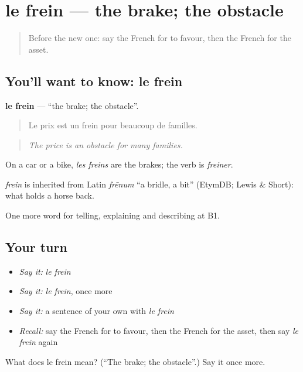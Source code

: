 \section[le frein]{le frein — the brake; the obstacle}

\label{lesson:FR-C352-frein}



\begin{quote}
Before the new one: say the French for to favour, then the French for the asset.
\end{quote}

\subsection*{You'll want to know: le frein}
\textbf{le frein} — \textquotedblleft{}the brake; the obstacle\textquotedblright{}.

\begin{quote}
Le prix est un frein pour beaucoup de familles.
\end{quote}

\begin{quote}
\emph{The price is an obstacle for many families.}
\end{quote}

On a car or a bike, \emph{les freins} are the brakes; the verb is \emph{freiner}.

\begin{cousinweb}
\emph{frein} is inherited from Latin \emph{frēnum} \textquotedblleft{}a bridle, a bit\textquotedblright{} (EtymDB; Lewis \& Short): what holds a horse back.
\end{cousinweb}

\begin{grammarlens}[title={What you've built}]
One more word for telling, explaining and describing at B1.
\end{grammarlens}

\subsection*{Your turn}
\begin{itemize}
\raggedright
  \item \emph{Say it:} \emph{le frein}
  \item \emph{Say it:} \emph{le frein}, once more
  \item \emph{Say it:} a sentence of your own with \emph{le frein}
  \item \emph{Recall:} say the French for to favour, then the French for the asset, then say \emph{le frein} again
\end{itemize}

\begin{tcolorbox}[breakable,colback=teal!4,colframe=teal!35!black,title={Before you move on}]
What does le frein mean? (\textquotedblleft{}The brake; the obstacle\textquotedblright{}.) Say it once more.
\end{tcolorbox}
